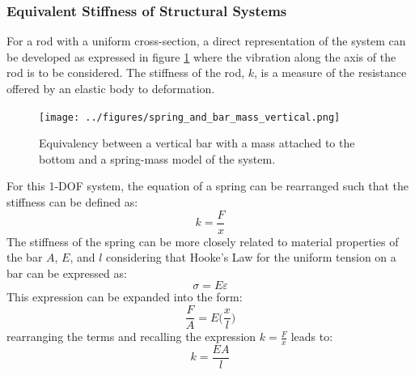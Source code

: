 \documentclass[12pt,letter]{article}
\begin{document}
\pagebreak
		\subsubsection{Equivalent Stiffness of Structural Systems}	
		
            For a rod with a uniform cross-section, a direct representation of the system can be developed as expressed in figure \ref{fig:spring_and_bar_mass_vertical} where the vibration along the axis of the rod is to be considered. The stiffness of the rod, $k$, is a measure of the resistance offered by an elastic body to deformation. 

			
			\begin{figure}[H]
				\centering
				\texttt{[image: ../figures/spring\_and\_bar\_mass\_vertical.png]}
				\caption{Equivalency between a vertical bar with a mass attached to the bottom and a spring-mass model of the system.}
				\label{fig:spring_and_bar_mass_vertical}
			\end{figure}
			
			For this 1-DOF system, the equation of a spring can be rearranged such that the stiffness can be defined as:
			\begin{equation}
				k=\frac{F}{x}
			\end{equation}
			The stiffness of the spring can be more closely related to material properties of the bar $A$, $E$, and $l$ considering that Hooke's Law for the uniform tension on a bar can be expressed as:
			\begin{equation}
				\sigma = E \varepsilon
			\end{equation}			
			This expression can be expanded into the form:
			\begin{equation}
				\frac{F}{A} = E \Big( \frac{x}{l} \Big)
			\end{equation}					
			rearranging the terms and recalling the expression $k = \frac{F}{x}$ leads to:			
			\begin{equation}
				 k = \frac{EA}{l}
			\end{equation}				
	
\end{document}
